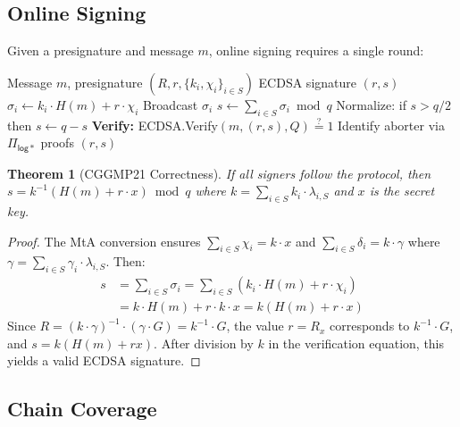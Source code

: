 \documentclass[11pt,twocolumn]{article}
\newtheorem{theorem}{Theorem}[section]
\begin{document}
\subsection{Online Signing}

Given a presignature and message $m$, online signing requires a single round:

\begin{algorithm}[H]
\caption{CGGMP21 Online Signing}
\label{alg:cggmp-sign}
\begin{algorithmic}[1]
\Require Message $m$, presignature $(R, r, \{k_i, \chi_i\}_{i \in S})$
\Ensure ECDSA signature $(r, s)$
  \State $\sigma_i \gets k_i \cdot H(m) + r \cdot \chi_i$
  \State Broadcast $\sigma_i$
\EndFor
\State $s \gets \sum_{i \in S} \sigma_i \bmod q$
\State Normalize: if $s > q/2$ then $s \gets q - s$ 
\State \textbf{Verify:} ECDSA.Verify$(m, (r, s), Q) \stackrel{?}{=} 1$
  \State Identify aborter via $\Pi_{\mathsf{log*}}$ proofs 
\EndIf
\State \Return $(r, s)$
\end{algorithmic}
\end{algorithm}

\begin{theorem}[CGGMP21 Correctness]
\label{thm:cggmp-correct}
If all signers follow the protocol, then $s = k^{-1}(H(m) + r \cdot x) \bmod q$
where $k = \sum_{i \in S} k_i \cdot \lambda_{i,S}$ and $x$ is the secret key.
\end{theorem}

\begin{proof}
The MtA conversion ensures $\sum_{i \in S} \chi_i = k \cdot x$ and
$\sum_{i \in S} \delta_i = k \cdot \gamma$ where $\gamma = \sum_{i \in S} \gamma_i
\cdot \lambda_{i,S}$. Then:
\begin{align*}
s &= \sum_{i \in S} \sigma_i = \sum_{i \in S} (k_i \cdot H(m) + r \cdot \chi_i) \\
  &= k \cdot H(m) + r \cdot k \cdot x = k(H(m) + r \cdot x)
\end{align*}
Since $R = (k \cdot \gamma)^{-1} \cdot (\gamma \cdot G) = k^{-1} \cdot G$, the
value $r = R_x$ corresponds to $k^{-1} \cdot G$, and $s = k(H(m) + rx)$. After
division by $k$ in the verification equation, this yields a valid ECDSA signature.
\end{proof}

\subsection{Chain Coverage}
\end{document}
